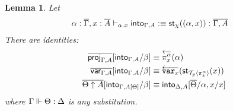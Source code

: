 \documentclass[10pt]{article}
\newtheorem{lemma}{Lemma}
\theoremstyle{definition}
\newcommand{\yields}{\vdash}
\newcommand{\rewrite}[2]{\overleftarrow{#1}(#2)}
\newcommand\StI[2]{\ensuremath{\mathsf{st}_{#1}(#2)}}
\newcommand\ApEl[2]{\mathcal{T}_{#1}\langle#2\rangle}
\begin{document}
\begin{lemma}\label{lem:into-identities}
Let 
\begin{align*}
\alpha : \upstairs{\Gamma}, x : \upstairs{A} &\yields_{\alpha.x} \into{\Gamma, A} :\equiv \StI{\chi}{(\alpha, x)} : \upstairs{\Gamma, A}
\end{align*}
There are identities:
\begin{align*}
\upstairs{\proj{\Gamma, A}}[\into{\Gamma, A}/\beta] &\equiv \rewrite{\pi^\alpha_x}{\alpha} \\
\upstairs{\qvar{\Gamma, A}}[\into{\Gamma, A}/\beta] &\equiv \rewrite{\var{x}}{\StI{\ApEl{p}{\pi^{\alpha}_x}}{x}} \\
\upstairs{\Theta \uparrow A}[\into{\Gamma, A[\Theta]}/\beta] &\equiv \into{\Delta, A}[\upstairs{\Theta}/\alpha, x / x]
\end{align*}
where $\Gamma \Vdash \Theta : \Delta$ is any substitution.
\end{lemma}
\end{document}
